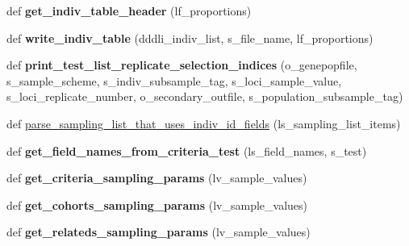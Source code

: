 \begin{DoxyCompactItemize}
\item 
def {\bfseries get\+\_\+indiv\+\_\+table\+\_\+header} (lf\+\_\+proportions)\hypertarget{namespacenegui_1_1pgdriveneestimator_a5764313a499a7eb9fc99db74768cd10d}{}\label{namespacenegui_1_1pgdriveneestimator_a5764313a499a7eb9fc99db74768cd10d}

\item 
def {\bfseries write\+\_\+indiv\+\_\+table} (dddli\+\_\+indiv\+\_\+list, s\+\_\+file\+\_\+name, lf\+\_\+proportions)\hypertarget{namespacenegui_1_1pgdriveneestimator_a263379187199613b753db847b3105160}{}\label{namespacenegui_1_1pgdriveneestimator_a263379187199613b753db847b3105160}

\item 
def {\bfseries print\+\_\+test\+\_\+list\+\_\+replicate\+\_\+selection\+\_\+indices} (o\+\_\+genepopfile, s\+\_\+sample\+\_\+scheme, s\+\_\+indiv\+\_\+subsample\+\_\+tag, s\+\_\+loci\+\_\+sample\+\_\+value, s\+\_\+loci\+\_\+replicate\+\_\+number, o\+\_\+secondary\+\_\+outfile, s\+\_\+population\+\_\+subsample\+\_\+tag)\hypertarget{namespacenegui_1_1pgdriveneestimator_ad9f7e28c15ac7902cb795cb27997648e}{}\label{namespacenegui_1_1pgdriveneestimator_ad9f7e28c15ac7902cb795cb27997648e}

\item 
def \hyperlink{namespacenegui_1_1pgdriveneestimator_a8918df5a619173d4baa530e79dfe2385}{parse\+\_\+sampling\+\_\+list\+\_\+that\+\_\+uses\+\_\+indiv\+\_\+id\+\_\+fields} (ls\+\_\+sampling\+\_\+list\+\_\+items)
\item 
def {\bfseries get\+\_\+field\+\_\+names\+\_\+from\+\_\+criteria\+\_\+test} (ls\+\_\+field\+\_\+names, s\+\_\+test)\hypertarget{namespacenegui_1_1pgdriveneestimator_ab7cb1ccdd969e3d2cd3ba2b8dadaa4d9}{}\label{namespacenegui_1_1pgdriveneestimator_ab7cb1ccdd969e3d2cd3ba2b8dadaa4d9}

\item 
def {\bfseries get\+\_\+criteria\+\_\+sampling\+\_\+params} (lv\+\_\+sample\+\_\+values)\hypertarget{namespacenegui_1_1pgdriveneestimator_a08185cf9c5aff8db21ee0eefa04cd237}{}\label{namespacenegui_1_1pgdriveneestimator_a08185cf9c5aff8db21ee0eefa04cd237}

\item 
def {\bfseries get\+\_\+cohorts\+\_\+sampling\+\_\+params} (lv\+\_\+sample\+\_\+values)\hypertarget{namespacenegui_1_1pgdriveneestimator_ac5418cd5138d005dae534383305be65e}{}\label{namespacenegui_1_1pgdriveneestimator_ac5418cd5138d005dae534383305be65e}

\item 
def {\bfseries get\+\_\+relateds\+\_\+sampling\+\_\+params} (lv\+\_\+sample\+\_\+values)\hypertarget{namespacenegui_1_1pgdriveneestimator_ab57b50b97d036e0ac3cd5d62728312ba}{}\label{namespacenegui_1_1pgdriveneestimator_ab57b50b97d036e0ac3cd5d62728312ba}


\end{DoxyCompactItemize}
